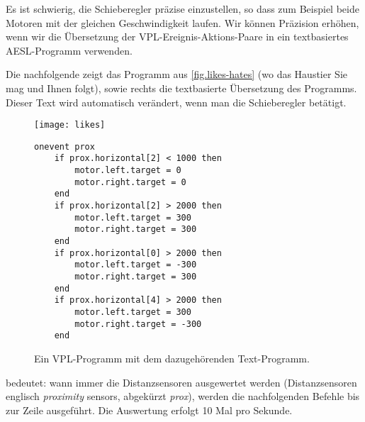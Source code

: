 \label{a.tech}


Es ist schwierig, die Schieberegler präzise einzustellen, so dass zum Beispiel beide Motoren mit der gleichen Geschwindigkeit laufen. Wir können Präzision erhöhen, wenn wir die Übersetzung der VPL-Ereignis-Aktions-Paare in ein textbasiertes AESL-Programm  verwenden.


Die nachfolgende  zeigt das Programm aus \cref{fig.likes-hates} (wo das Haustier Sie mag und Ihnen folgt), sowie rechts die textbasierte Übersetzung des Programms. Dieser Text wird automatisch verändert, wenn man die Schieberegler betätigt.  

\begin{figure}[hbt]
\texttt{[image: likes]}
\hfill
\begin{minipage}[b]{0.55\textwidth}
\begin{footnotesize}
\begin{verbatim}
onevent prox
    if prox.horizontal[2] < 1000 then
        motor.left.target = 0
        motor.right.target = 0
    end
    if prox.horizontal[2] > 2000 then
        motor.left.target = 300
        motor.right.target = 300
    end
    if prox.horizontal[0] > 2000 then
        motor.left.target = -300
        motor.right.target = 300
    end
    if prox.horizontal[4] > 2000 then
        motor.left.target = 300
        motor.right.target = -300
    end
\end{verbatim}
\end{footnotesize}
\vspace*{8ex}
\end{minipage}
\caption{Ein VPL-Programm mit dem dazugehörenden Text-Programm.}
\label{fig.textcode}
\end{figure}

 bedeutet: wann immer die Distanzsensoren ausgewertet werden (Distanzsensoren englisch \emph{proximity} sensors, abgekürzt \emph{prox}), werden die nachfolgenden Befehle bis zur Zeile  ausgeführt. Die Auswertung erfolgt 10 Mal pro Sekunde. 

